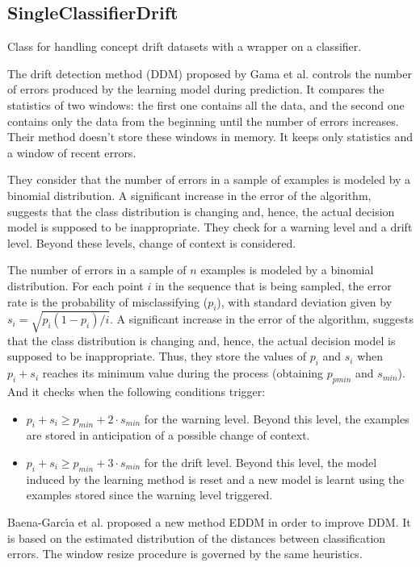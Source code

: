 \documentclass[a4paper,12pt,twoside]{book}
\begin{document}
 \subsection{SingleClassifierDrift} Class for handling concept drift datasets with a wrapper on a
 classifier.

The drift detection method (DDM) proposed by Gama et al. controls 
the number of errors produced by the learning model during prediction. 
It compares the statistics of two windows: the first one contains all the data, 
and the second one contains only the data from the beginning until the number of
errors increases. Their method doesn't store these windows in memory. It keeps 
only statistics and a window of recent errors.

They consider that the number of errors in a sample of examples is modeled by a binomial 
distribution. A significant increase in the error of the algorithm, suggests
that the class distribution is changing and, hence, the actual decision model is
supposed to be inappropriate. They check for a warning level and a drift level. Beyond
these levels, change of context is considered.

The number of errors in a sample of $n$ examples is modeled by a binomial 
distribution. For each point $i$ in the sequence that is being sampled, the error
rate is the probability of misclassifying ($p_i$), with standard deviation given
by $s_i = \sqrt{p_i(1 - p_i)/i}$. 
A significant increase in the error of the algorithm, suggests
that the class distribution is changing and, hence, the actual decision model is
supposed to be inappropriate. Thus, they store the values of $p_i$ and $s_i$ when
$p_i+s_i$ reaches its minimum value during the process (obtaining $p_{pmin}$ and $s_{min}$).
And it checks when the following conditions trigger:
\begin{itemize}
\item $p_i + s_i \geq p_{min} + 2 \cdot s_{min}$ for the warning level. 
	Beyond this level, the examples are stored in anticipation of a possible
	change of context.
\item $p_i + s_i \geq p_{min} + 3 \cdot s_{min}$ for the drift level. Beyond this
	level, the model induced by the learning method is reset and a new model
	is learnt using the examples stored since the warning level triggered.
\end{itemize}

Baena-Garc\'{\i}a et al. proposed a new method EDDM in order to improve DDM. 
It is based on the estimated distribution of the distances between classification errors.
The window resize procedure is governed by the same heuristics.
\end{document}
